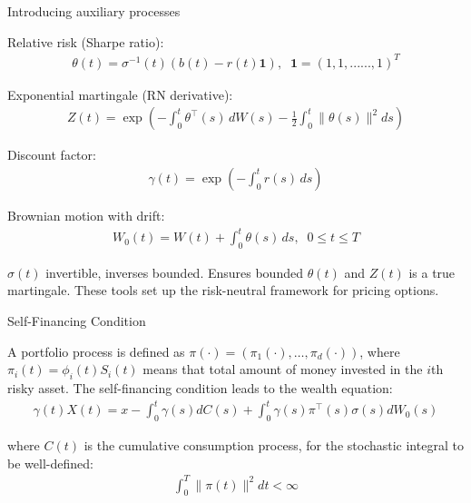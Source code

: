 \documentclass{beamer}
\begin{document}
\begin{frame}{Introducing auxiliary processes}

    {\footnotesize \footnotesize
    \par Relative risk (Sharpe ratio): 
    \begin{align*}
            \theta(t) = \sigma^{-1}(t)\left(b(t) - r(t)\mathbf{1}\right),\;\; \mathbf{1} = (1,1,......,1)^T
    \end{align*}
    \par Exponential martingale (RN derivative): 
    \begin{align*}
        Z(t) = \exp\left(-\int_{0}^{t}\theta^{\top}(s)\,dW(s) - \frac{1}{2}\int_{0}^{t}\|\theta(s)\|^{2}ds\right)
    \end{align*}
    \par  \pause Discount factor:
    \begin{align*}
        \gamma(t) = \exp\left(-\int_{0}^{t}r(s)\,ds\right)
    \end{align*}
    \par Brownian motion with drift:
    \begin{align*}
         W_0(t) = W(t) + \int_{0}^{t}\theta(s)\,ds,\;\; 0\leq t\leq T
    \end{align*}
    \par  \pause $\sigma(t)$ invertible, inverses bounded. Ensures bounded $\theta(t)$ and $Z(t)$ is a true martingale.
    These tools set up the risk-neutral framework for pricing options.
    }   
\end{frame}

\begin{frame}{Self-Financing Condition}

    {\footnotesize \footnotesize
    \par A portfolio process is defined as $\pi(\cdot) = (\pi_1(\cdot), \ldots, \pi_d(\cdot))$, where $\pi_i(t) = \phi_i(t) S_i(t)$ means that 
    total amount of money invested in the $i$th risky asset. The self-financing condition leads to the wealth equation:
    \begin{align*}
        \gamma(t)X(t) = x - \int_0^t \gamma(s)dC(s) + \int_0^t \gamma(s)\pi^\top(s)\sigma(s)dW_0(s)
    \end{align*}
    \par where $C(t)$ is the cumulative consumption process, for the stochastic integral to be well-defined:
    \begin{align*}
        \int_{0}^{T} \|\pi(t)\|^{2}  dt < \infty
    \end{align*}
    }   
\end{frame}
 
\end{document}
